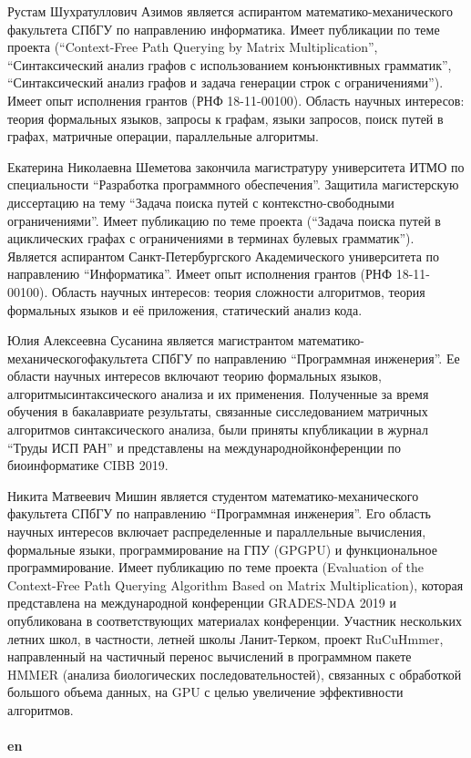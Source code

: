 \documentclass[12pt]{article}  %
\theoremstyle{remark}
\begin{document}
Рустам Шухратуллович Азимов является аспирантом математико-механического факультета СПбГУ по направлению информатика. Имеет публикации по теме проекта (``Context-Free Path Querying by Matrix Multiplication'', ``Синтаксический анализ графов с использованием конъюнктивных грамматик'', ``Синтаксический анализ графов и задача генерации строк с ограничениями''). Имеет опыт исполнения грантов (РНФ 18-11-00100). Область научных интересов: теория формальных языков, запросы к графам, языки запросов, поиск путей в графах, матричные операции, параллельные алгоритмы.

Екатерина Николаевна Шеметова закончила магистратуру университета ИТМО по специальности ``Разработка программного обеспечения''. Защитила магистерскую диссертацию на тему ``Задача поиска путей с контекстно-свободными ограничениями''. Имеет публикацию по теме проекта (``Задача поиска путей в ациклических графах с
ограничениями в терминах булевых грамматик''). Является аспирантом Санкт-Петербургского Академического университета по направлению ``Информатика''. Имеет опыт исполнения грантов (РНФ 18-11-00100).
Область научных интересов: теория сложности алгоритмов, теория формальных языков и её приложения, статический анализ кода.

Юлия Алексеевна Сусанина является магистрантом математико-механическогофакультета СПбГУ по направлению “Программная инженерия”. Ее области научных интересов включают теорию формальных языков, алгоритмысинтаксического анализа и их применения. Полученные за время обучения в бакалавриате результаты, связанные сисследованием матричных алгоритмов синтаксического анализа, были приняты кпубликации в журнал “Труды ИСП РАН” и представлены на международнойконференции по биоинформатике CIBB 2019.

Никита Матвеевич Мишин является студентом математико-механического факультета СПбГУ  по направлению “Программная инженерия”.
Его область научных интересов включает распределенные и параллельные вычисления, формальные языки, программирование на ГПУ (GPGPU) и функциональное программирование.
Имеет публикацию по теме проекта (Evaluation of the Context-Free Path Querying Algorithm Based on Matrix Multiplication),
 которая представлена на международной конференции GRADES-NDA 2019 и опубликована в соответствующих материалах конференции.
Участник нескольких летних школ, в частности, летней школы Ланит-Терком, проект RuCuHmmer,
направленный на частичный перенос вычислений в программном пакете HMMER (анализа биологических последовательностей),
связанных с обработкой большого объема данных, на GPU с целью увеличение эффективности алгоритмов.
\\
\\
\textbf{en}
\end{document}
